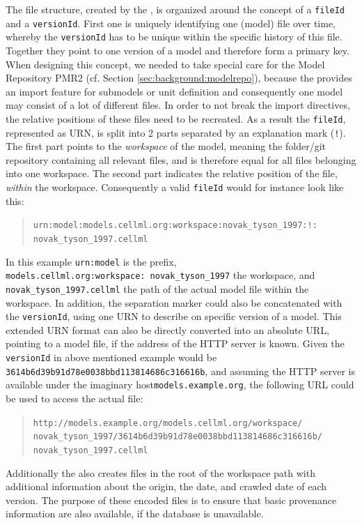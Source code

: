The file structure, created by the \modelcrawler, is organized around the concept of a \texttt{fileId} and a \texttt{versionId}. First one is uniquely identifying one (model) file over time, whereby the \texttt{versionId} has to be unique within the specific history of this file. Together they point to one version of a model and therefore form a primary key.
When designing this concept, we needed to take special care for the \cellml Model Repository PMR2 (cf. Section \ref{sec:background:modelrepo}), because the \cellml provides an import feature for submodels or unit definition and consequently one model may consist of a lot of different files. In order to not break the import directives, the relative positions of these files need to be recreated. As a result the \texttt{fileId}, represented as URN, is split into 2 parts separated by an explanation mark (\texttt{!}). The first part points to the \emph{workspace} of the model, meaning the folder/git repository containing all relevant files, and is therefore equal for all files belonging into one workspace. The second part indicates the relative position of the file, \emph{within} the workspace.
Consequently a valid \texttt{fileId} would for instance look like this:
\begin{quote}
	\texttt{urn:model:models.cellml.org:workspace:novak\_tyson\_1997:!:\linebreak
	novak\_tyson\_1997.cellml}
\end{quote}
In this example \texttt{urn:model} is the prefix, \texttt{models.cellml.org:workspace:\ novak\_tyson\_1997} the workspace, and \texttt{novak\_tyson\_1997.cellml} the path of the actual model file within the workspace. In addition, the separation marker could also be concatenated with the \texttt{versionId}, using one URN to describe on specific version of a model. This extended URN format can also be directly converted into an absolute URL, pointing to a model file, if the address of the HTTP server is known.
Given the \texttt{versionId} in above mentioned example would be \texttt{3614b6d39b91d78e0038bbd113814686c316616b}, and assuming the HTTP server is available under the imaginary host\linebreak[4] \texttt{models.example.org}, the following URL could be used to access the actual file:
\begin{quote}
	\texttt{http://models.example.org/models.cellml.org/workspace/
		novak\_tyson\_1997/3614b6d39b91d78e0038bbd113814686c316616b/
		novak\_tyson\_1997.cellml}
\end{quote}

Additionally the \modelcrawler also creates files in the root of the workspace path with additional information about the origin, the date, and crawled date of each version.
The purpose of these \json encoded files is to ensure that basic provenance information are also available, if the \masymos database is unavailable.

